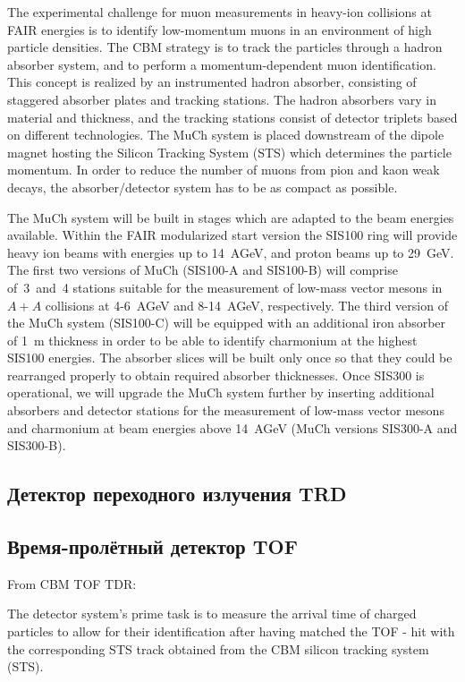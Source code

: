 The experimental challenge for muon measurements in heavy-ion collisions at FAIR energies is to identify low-momentum muons in an environment of high particle densities. The CBM strategy is to track the particles through a hadron absorber system, and to perform a momentum-dependent muon identification. This concept is realized by an instrumented hadron absorber, consisting of staggered absorber plates and tracking stations. The hadron absorbers vary in material and thickness, and the tracking stations consist of detector triplets based on different technologies. The MuCh system is placed downstream of the dipole magnet hosting the Silicon Tracking System (STS) which determines the particle momentum. In order to reduce the number of muons from pion and kaon weak decays, the absorber/detector system has to be as compact as possible.

The MuCh system will be built in stages which are adapted to the beam energies available. Within the FAIR modularized start version the SIS100 ring will provide heavy ion beams with energies up to 14~AGeV, and proton beams up to 29~GeV. The first two versions of MuCh (SIS100-A and SIS100-B) will comprise of~3~and~4 stations suitable for the measurement of low-mass vector mesons in $ A + A $ collisions at 4-6~AGeV and 8-14~AGeV, respectively. The third version of the MuCh system (SIS100-C) will be equipped with an additional iron absorber of 1~m thickness in order to be able to identify charmonium at the highest SIS100 energies. The absorber slices will be built only once so that they could be rearranged properly to obtain required absorber thicknesses. Once SIS300 is operational, we will upgrade the MuCh system further by inserting additional absorbers and detector stations for the measurement of low-mass vector mesons and charmonium at beam energies above 14~AGeV (MuCh versions SIS300-A and SIS300-B).

\subsection{Детектор переходного излучения TRD}\label{sec:secTRD}

\subsection{Время-пролётный детектор TOF}\label{sec:secTOF}

From CBM TOF TDR:

The detector system’s prime task is to measure the arrival time of charged particles to allow for their identification after having matched the TOF - hit with the corresponding STS track obtained from the CBM silicon tracking system (STS). 

